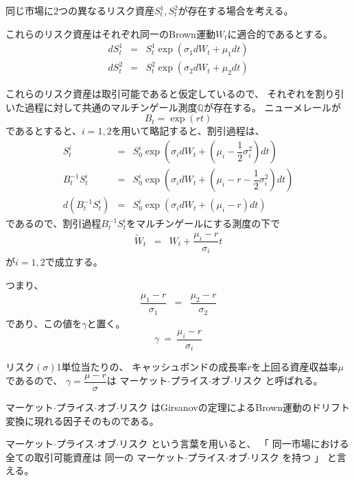 \documentclass[uplatex,a4j,12pt,dvipdfmx]{jsarticle}
\begin{document}
${}$

同じ市場に2つの異なるリスク資産$S^{1}_{t},S^{2}_{t}$が存在する場合を考える。

これらのリスク資産はそれぞれ同一のBrown運動$W_{t}$に適合的であるとする。
%
%
\begin{eqnarray*}
	d S^{1}_{t}
	&=&
	S^{1}_{t} \exp \left( \sigma_{1} dW_{t} + \mu_{1} dt \right)
	\\
	d S^{2}_{t}
	&=&
	S^{2}_{t} \exp \left( \sigma_{2} dW_{t} + \mu_{2} dt \right)
\end{eqnarray*}
%
%

これらのリスク資産は取引可能であると仮定しているので、
それぞれを割り引いた過程に対して共通のマルチンゲール測度$\mathbb{Q}$が存在する。
ニューメレールが
$$
	B_{t} = \exp ( rt)
$$
であるとすると、$i=1,2$を用いて略記すると、割引過程は、
%
%
\begin{eqnarray*}
	S^{i}_{t}
	&=&
	S^{i}_{0} \exp \left( \sigma_{i} dW_{t} + \left( \mu_{i} - \dfrac{1}{2} \sigma_{i}^{2} \right) dt \right)
	\\
	B^{-1}_{t} S^{i}_{t}
	&=&
	S^{i}_{0} \exp \left( \sigma_{i} dW_{t} + \left( \mu_{i} - r - \dfrac{1}{2} \sigma_{i}^{2} \right) dt \right)
	\\
	d ( B^{-1}_{t} S^{i}_{t} )
	&=&
	S^{i}_{0} \exp \left( \sigma_{i} dW_{t} + \left( \mu_{i} - r \right) dt \right)
\end{eqnarray*}
%
%
であるので、割引過程$B^{-1}_{t} S^{i}_{t}$をマルチンゲールにする測度の下で
%
%
\begin{eqnarray*}
	\tilde{W}_{t}
	&=&
	W_{t}
	+
	\dfrac{\mu_{i} - r}{\sigma_{i}}
	t
\end{eqnarray*}
%
%
が$i=1,2$で成立する。

つまり、
%
%
\begin{eqnarray*}
	\dfrac{\mu_{1} - r}{\sigma_{1}}
	&=&
	\dfrac{\mu_{2} - r}{\sigma_{2}}
\end{eqnarray*}
%
%
であり、この値を$\gamma$と置く。
$$
	\gamma
	\ = \
	\dfrac{\mu_{i} - r}{\sigma_{i}}
$$

リスク$(\sigma)$1単位当たりの、
キャッシュボンドの成長率$r$を上回る資産収益率$\mu$であるので、
$\gamma=\dfrac{\mu -r}{\sigma}$は
マーケット$\cdot$プライス$\cdot$オブ$\cdot$リスク
と呼ばれる。

マーケット$\cdot$プライス$\cdot$オブ$\cdot$リスク
はGirsanovの定理によるBrown運動のドリフト変換に現れる因子そのものである。

マーケット$\cdot$プライス$\cdot$オブ$\cdot$リスク
という言葉を用いると、
「
同一市場における全ての取引可能資産は
同一の
マーケット$\cdot$プライス$\cdot$オブ$\cdot$リスク
を持つ
」
と言える。
${}$
\end{document}
